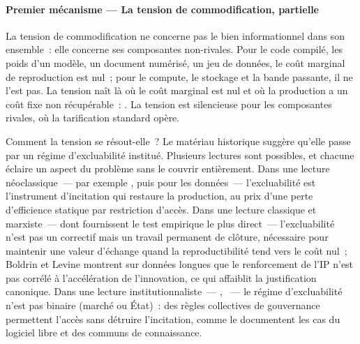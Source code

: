 \paragraph{Premier mécanisme --- La tension de commodification, partielle}

\markNEO \markINST \markMARX
La tension de commodification ne concerne pas le bien informationnel dans son ensemble~: elle concerne ses composantes non-rivales. Pour le code compilé, les poids d'un modèle, un document numérisé, un jeu de données, le coût marginal de reproduction est nul~; pour le compute, le stockage et la bande passante, il ne l'est pas. La tension naît là où le coût marginal est nul et où la production a un coût fixe non récupérable~: . La tension est silencieuse pour les composantes rivales, où la tarification standard opère.

Comment la tension se résout-elle~? Le matériau historique suggère qu'elle passe par un régime d'excluabilité institué. Plusieurs lectures sont possibles, et chacune éclaire un aspect du problème sans le couvrir entièrement. Dans une lecture néoclassique~--- par exemple \textcite{arrow_welfare_1962}, puis \textcite{jones_nonrivalry_2020} pour les données~--- l'excluabilité est l'instrument d'incitation qui restaure la production, au prix d'une perte d'efficience statique par restriction d'accès. Dans une lecture classique et marxiste~--- dont \textcite{boldrin_against_2008} fournissent le test empirique le plus direct~--- l'excluabilité n'est pas un correctif mais un travail permanent de clôture, nécessaire pour maintenir une valeur d'échange quand la reproductibilité tend vers le coût nul~; Boldrin et Levine montrent sur données longues que le renforcement de l'IP n'est pas corrélé à l'accélération de l'innovation, ce qui affaiblit la justification canonique. Dans une lecture institutionnaliste~--- \textcite{ostrom_governing_1990}, \textcite{hess_understanding_2007}~--- le régime d'excluabilité n'est pas binaire (marché ou État)~: des règles collectives de gouvernance permettent l'accès sans détruire l'incitation, comme le documentent les cas du logiciel libre et des communs de connaissance.


